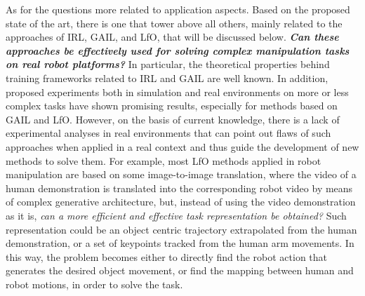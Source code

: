 As for the questions more related to application aspects. Based on the proposed state of the art, there is one that tower above all others, mainly related to the approaches of IRL, GAIL, and LfO, that will be discussed below.
\newline \textbf{\textit{Can these approaches be effectively used for solving complex manipulation tasks on real robot platforms?}} In particular, the theoretical properties behind training frameworks related to IRL and GAIL are well known. In addition, proposed experiments both in simulation and real environments on more or less complex tasks have shown promising results, especially for methods based on GAIL and LfO. However, on the basis of current knowledge, there is a lack of experimental analyses in real environments that can point out flaws of such approaches when applied in a real context and thus guide the development of new methods to solve them. For example, most LfO methods applied in robot manipulation are based on some image-to-image translation, where the video of a human demonstration is translated into the corresponding robot video by means of complex generative architecture, but, instead of using the video demonstration as it is, \textit{can a more efficient and effective task representation be obtained?} Such representation could be an object centric trajectory extrapolated from the human demonstration, or a set of keypoints tracked from the human arm movements. In this way, the problem becomes either to directly find the robot action that generates the desired object movement, or find the mapping between human and robot motions, in order to solve the task.

